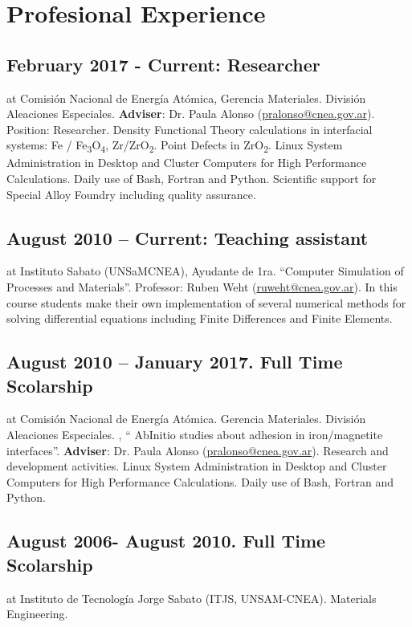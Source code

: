 \section{Profesional Experience}

\subsection{February 2017 - Current: Researcher} at Comisión Nacional de Energía Atómica,  Gerencia Materiales. División Aleaciones Especiales. \textbf{ Adviser}: Dr. Paula Alonso (\url{pralonso@cnea.gov.ar}). Position: Researcher. Density Functional Theory calculations in interfacial systems: Fe / Fe\textsubscript{3}O\textsubscript{4}, Zr/ZrO\textsubscript{2}. Point Defects in ZrO\textsubscript{2}. Linux System Administration in Desktop and Cluster Computers for High Performance Calculations. Daily use of Bash, Fortran and Python. Scientific support for Special Alloy Foundry including quality assurance.

\subsection{August 2010 – Current: Teaching assistant} at Instituto Sabato (UNSaM\-CNEA), Ayudante de 1ra. “Computer Simulation of Processes and Materials”. Professor: Ruben Weht (\url{ruweht@cnea.gov.ar}). In this course students make their own implementation of several numerical methods for solving differential equations including Finite Differences and Finite Elements.

\subsection{August 2010 – January 2017. Full Time Scolarship} at Comisión Nacional de Energía Atómica. Gerencia Materiales. División Aleaciones Especiales. , “ Ab\-Initio studies about adhesion in iron/magnetite interfaces”. \textbf{Adviser}: Dr. Paula Alonso (\url{pralonso@cnea.gov.ar}). Research and development activities. Linux System Administration in Desktop and Cluster Computers for High Performance Calculations. Daily use of Bash, Fortran and Python. 

\subsection{August 2006- August 2010. Full Time Scolarship } at Instituto de Tecnología Jorge Sabato (ITJS, UNSAM-CNEA). Materials Engineering. 

